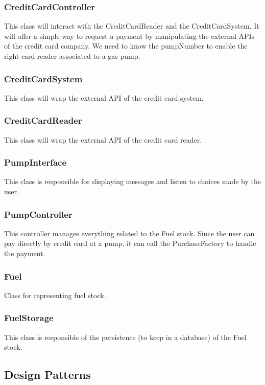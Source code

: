 \documentclass[11pt, a4paper]{article}
\begin{document}
\subsubsection*{CreditCardController}
This class will interact with the CreditCardReader and the CreditCardSystem. It will offer a simple way to request a payment by manipulating the external APIs of the credit card company. We need to know the pumpNumber to enable the right card reader associated to a gas pump.

\subsubsection*{CreditCardSystem}
This class will wrap the external API of the credit card system.

\subsubsection*{CreditCardReader}
This class will wrap the external API of the credit card reader.

\subsubsection*{PumpInterface}
This class is responsible for displaying messages and listen to choices made by the user.

\subsubsection*{PumpController}
This controller manages everything related to the Fuel stock. Since the user can pay directly by credit card at a pump, it can call the PurchaseFactory to handle the payment.

\subsubsection*{Fuel}
Class for representing fuel stock.

\subsubsection*{FuelStorage}
This class is responsible of the persistence (to keep in a database) of the Fuel stock.




\subsection*{Design Patterns}
\end{document}
